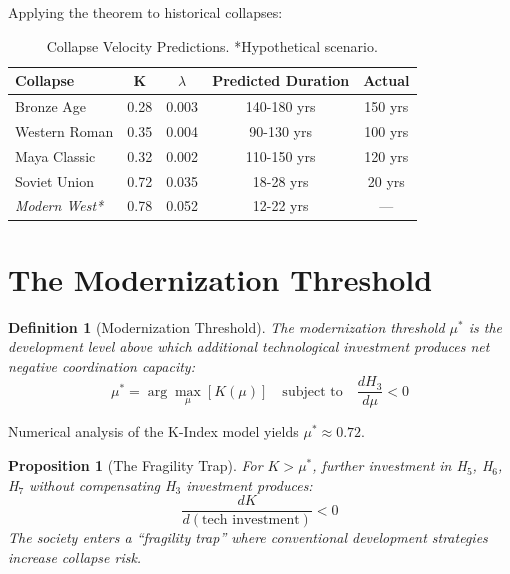 \documentclass[11pt,a4paper]{article}
\newtheorem{proposition}{Proposition}
\newtheorem{definition}{Definition}
\begin{document}
Applying the theorem to historical collapses:

\begin{table}[h]
\centering
\begin{tabular}{lcccc}
\toprule
\textbf{Collapse} & \textbf{K} & \textbf{$\lambda$} & \textbf{Predicted Duration} & \textbf{Actual} \\
\midrule
Bronze Age & 0.28 & 0.003 & 140-180 yrs & 150 yrs \\
Western Roman & 0.35 & 0.004 & 90-130 yrs & 100 yrs \\
Maya Classic & 0.32 & 0.002 & 110-150 yrs & 120 yrs \\
Soviet Union & 0.72 & 0.035 & 18-28 yrs & 20 yrs \\
\textit{Modern West*} & 0.78 & 0.052 & 12-22 yrs & --- \\
\bottomrule
\end{tabular}
\caption{Collapse Velocity Predictions. *Hypothetical scenario.}
\end{table}

\section{The Modernization Threshold}

\begin{definition}[Modernization Threshold]
The modernization threshold $\mu^*$ is the development level above which additional technological investment produces net negative coordination capacity:
\begin{equation}
\mu^* = \arg\max_\mu \left[ K(\mu) \right] \quad \text{subject to} \quad \frac{dH_3}{d\mu} < 0
\end{equation}
\end{definition}

Numerical analysis of the K-Index model yields $\mu^* \approx 0.72$.

\begin{proposition}[The Fragility Trap]
For $K > \mu^*$, further investment in H$_5$, H$_6$, H$_7$ without compensating H$_3$ investment produces:
\begin{equation}
\frac{dK}{d(\text{tech investment})} < 0
\end{equation}
The society enters a ``fragility trap'' where conventional development strategies increase collapse risk.
\end{proposition}
\end{document}
